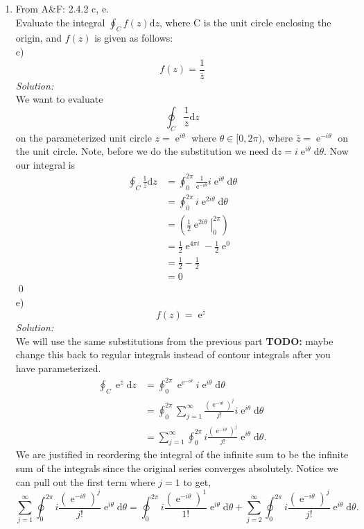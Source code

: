 \documentclass[10pt]{amsart}
\newcommand{\D}{\mathrm{d}}
\DeclareMathOperator{\E}{e}
\theoremstyle{nonumberplain}
\begin{document}
\begin{enumerate}[label={\bf {\arabic*}:}]
\item From A\&F: 2.4.2 c, e.\\
Evaluate the integral $\oint_Cf(z)\D z$, where C is the unit circle enclosing the origin, and $f(z)$ is given as follows: \\
c) $$f(z) = \frac {1} {\bar z}$$
\textit{Solution:} \\
We want to evaluate
$$
\oint_C\frac {1} {\bar z} \D z
$$
on the parameterized unit circle $z = \E^{i\theta}$ where $\theta \in [0, 2\pi)$, where $\bar z = \E^{-i\theta}$ on the unit circle.
Note, before we do the substitution we need $\D z = i\E^{i\theta} \D \theta$. Now our integral is
\begin{align*}
\oint_C\frac {1} {\bar z} \D z &= \oint_0^{2\pi}\frac {1} {\E^{-i\theta}} i\E^{i \theta}\D \theta \\
					  &= \oint_0^{2\pi} i \E^{2i \theta} \D \theta \\
					  &= \left( \left. \frac 1 2 \E^{2i\theta} \right|_0^{2\pi}\right) \\
					  &= \frac 1 2 \E^{4\pi i} - \frac 1 2 \E^{0} \\
					  &= \frac 1 2 - \frac 1 2 \\
					  &= 0
\end{align*}
\qed
\\
e) $$f(z) = \E^{\bar z}$$
\textit{Solution:} \\
We will use the same substitutions from the previous part \textbf{TODO:} maybe change this back to regular integrals instead of contour integrals after you have parameterized.
\begin{align*}
\oint_C\E^{\bar z} \D z &= \oint_0^{2\pi}\E^{\E^{-i\theta}} i\E^{i \theta}\D \theta \\
				  &= \oint_0^{2\pi} \sum_{j=1}^{\infty} \frac{\left(\E^{-i\theta}\right)^j}{j!} i\E^{i\theta} \D \theta \\
				  &= \sum_{j=1}^{\infty} \oint_0^{2\pi} i \frac{\left(\E^{-i\theta}\right)^j}{j!} {\E^{i\theta}} \D \theta.
\end{align*}
We are justified in reordering the integral of the infinite sum to be the infinite sum of the integrals since the original series converges absolutely.
Notice we can pull out the first term where $j=1$ to get,
$$
\sum_{j=1}^{\infty} \oint_0^{2\pi} i \frac{\left(\E^{-i\theta}\right)^j}{j!} {\E^{i\theta}} \D \theta
= \oint_0^{2\pi} i \frac{\left(\E^{-i\theta}\right)^1}{1!} {\E^{i\theta}} \D \theta
+ \sum_{j=2}^{\infty} \oint_0^{2\pi} i \frac{\left(\E^{-i\theta}\right)^j}{j!} {\E^{i\theta}} \D \theta.
$$
\end{enumerate}
\end{document}

